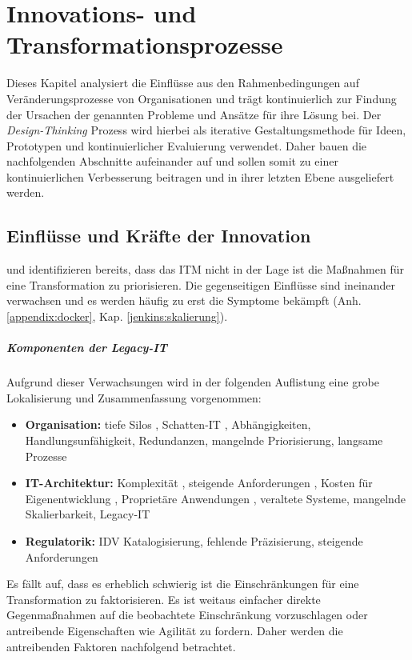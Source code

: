 \chapter{Innovations- und Transformationsprozesse}
Dieses Kapitel analysiert die Einflüsse aus den Rahmenbedingungen auf Veränderungsprozesse von Organisationen und trägt kontinuierlich zur Findung der Ursachen der genannten Probleme und Ansätze für ihre Lösung bei. Der \emph{Design-Thinking} Prozess wird hierbei als iterative Gestaltungsmethode für Ideen, Prototypen und kontinuierlicher Evaluierung verwendet. Daher bauen die nachfolgenden Abschnitte aufeinander auf und sollen somit zu einer kontinuierlichen Verbesserung beitragen und in ihrer letzten Ebene ausgeliefert werden.

\section{Einflüsse und Kräfte der Innovation}
\citet{Ganswindt2006} und \citet{Koch2016} identifizieren bereits, dass das \ac{ITM} nicht in der Lage ist die Maßnahmen für eine Transformation zu priorisieren.
Die gegenseitigen Einflüsse sind ineinander verwachsen und es werden häufig zu erst die Symptome bekämpft (Anh.\ref{appendix:docker}, Kap. \ref{jenkins:skalierung}).

\paragraph{Komponenten der Legacy-IT}
\label{einschr:assets}
Aufgrund dieser Verwachsungen wird in der folgenden Auflistung eine grobe Lokalisierung und Zusammenfassung vorgenommen:
\begin{itemize}
    \item \textbf{Organisation:} tiefe Silos \cite{Gupta:2017}, Schatten-IT \cite{recht/Bornemann2018}, Abhängigkeiten, Handlungsunfähigkeit, Redundanzen, mangelnde Priorisierung, langsame Prozesse
    \item \textbf{IT-Architektur:} Komplexität \cite{Brockhoff2006}, steigende Anforderungen \cite{Brockhoff2006}, Kosten für Eigenentwicklung \cite{Gupta:2017}, Proprietäre Anwendungen \cite{Bussmann2006}, veraltete Systeme, mangelnde Skalierbarkeit, Legacy-IT
    \item \textbf{Regulatorik:} \ac{IDV} Katalogisierung\cite{recht/Bornemann2018}, fehlende Präzisierung, steigende Anforderungen
\end{itemize}

Es fällt auf, dass es erheblich schwierig ist die Einschränkungen für eine Transformation zu faktorisieren. Es ist weitaus einfacher direkte Gegenmaßnahmen auf die beobachtete Einschränkung vorzuschlagen oder antreibende Eigenschaften wie Agilität zu fordern. Daher werden die antreibenden Faktoren nachfolgend betrachtet.

